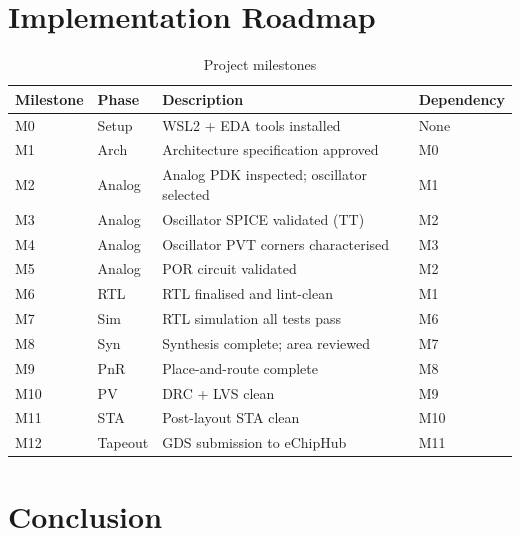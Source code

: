 \documentclass[11pt,a4paper]{article}
\begin{document}
\section{Implementation Roadmap}

\begin{table}[H]
  \centering
  \caption{Project milestones}
  \begin{tabularx}{\textwidth}{llXl}
    \toprule
    \textbf{Milestone} & \textbf{Phase} & \textbf{Description} & \textbf{Dependency} \\
    \midrule
    M0 & Setup    & WSL2 + EDA tools installed       & None \\
    M1 & Arch     & Architecture specification approved & M0 \\
    M2 & Analog   & Analog PDK inspected; oscillator selected & M1 \\
    M3 & Analog   & Oscillator SPICE validated (TT)  & M2 \\
    M4 & Analog   & Oscillator PVT corners characterised & M3 \\
    M5 & Analog   & POR circuit validated             & M2 \\
    M6 & RTL      & RTL finalised and lint-clean      & M1 \\
    M7 & Sim      & RTL simulation all tests pass     & M6 \\
    M8 & Syn      & Synthesis complete; area reviewed & M7 \\
    M9 & PnR      & Place-and-route complete          & M8 \\
    M10 & PV      & DRC + LVS clean                  & M9 \\
    M11 & STA     & Post-layout STA clean             & M10 \\
    M12 & Tapeout & GDS submission to eChipHub        & M11 \\
    \bottomrule
  \end{tabularx}
\end{table}

\section{Conclusion}
\end{document}
